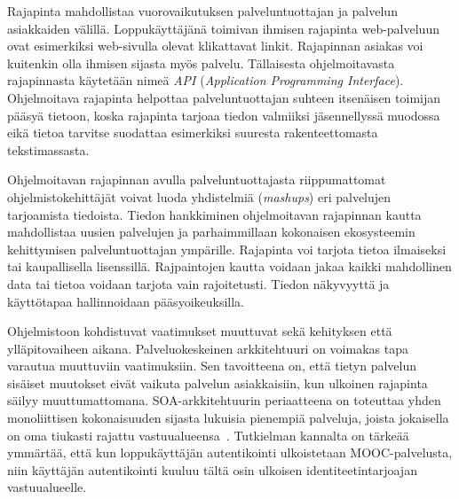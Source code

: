 \documentclass[finnish,gradu]{tktltiki}
\begin{document}

  Rajapinta mahdollistaa vuorovaikutuksen palveluntuottajan ja palvelun asiakkaiden välillä. Loppukäyttäjänä toimivan ihmisen rajapinta web-palveluun ovat esimerkiksi web-sivulla olevat klikattavat linkit. Rajapinnan asiakas voi kuitenkin olla ihmisen sijasta myös palvelu. Tällaisesta ohjelmoitavasta rajapinnasta käytetään nimeä \emph{API} (\emph{Application Programming Interface}). Ohjelmoitava rajapinta helpottaa palveluntuottajan suhteen itsenäisen toimijan pääsyä tietoon, koska rajapinta tarjoaa tiedon valmiiksi jäsennellyssä muodossa eikä tietoa tarvitse suodattaa esimerkiksi suuresta rakenteettomasta tekstimassasta.

  Ohjelmoitavan rajapinnan avulla palveluntuottajasta riippumattomat ohjelmistokehittäjät voivat luoda yhdistelmiä (\emph{mashups}) eri palvelujen tarjoamista tiedoista. Tiedon hankkiminen ohjelmoitavan rajapinnan kautta mahdollistaa uusien palvelujen ja parhaimmillaan kokonaisen ekosysteemin kehittymisen palveluntuottajan ympärille. Rajapinta voi tarjota tietoa ilmaiseksi tai kaupallisella lisenssillä. Rajpaintojen kautta voidaan jakaa kaikki mahdollinen data tai tietoa voidaan tarjota vain rajoitetusti. Tiedon näkyvyyttä ja käyttötapaa hallinnoidaan pääsyoikeuksilla.

  Ohjelmistoon kohdistuvat vaatimukset muuttuvat sekä kehityksen että ylläpitovaiheen aikana. Palveluokeskeinen arkkitehtuuri on voimakas tapa varautua muuttuviin vaatimuksiin. Sen tavoitteena on, että tietyn palvelun sisäiset muutokset eivät vaikuta palvelun asiakkaisiin, kun ulkoinen rajapinta säilyy muuttumattomana. SOA-arkkitehtuurin periaatteena on toteuttaa yhden monoliittisen kokonaisuuden sijasta lukuisia pienempiä palveluja, joista jokaisella on oma tiukasti rajattu vastuualueensa~\cite{soa_in_practise_2007}. Tutkielman kannalta on tärkeää ymmärtää, että kun loppukäyttäjän autentikointi ulkoistetaan MOOC-palvelusta, niin käyttäjän autentikointi kuuluu tältä osin ulkoisen identiteetintarjoajan vastuualueelle.
\end{document}
